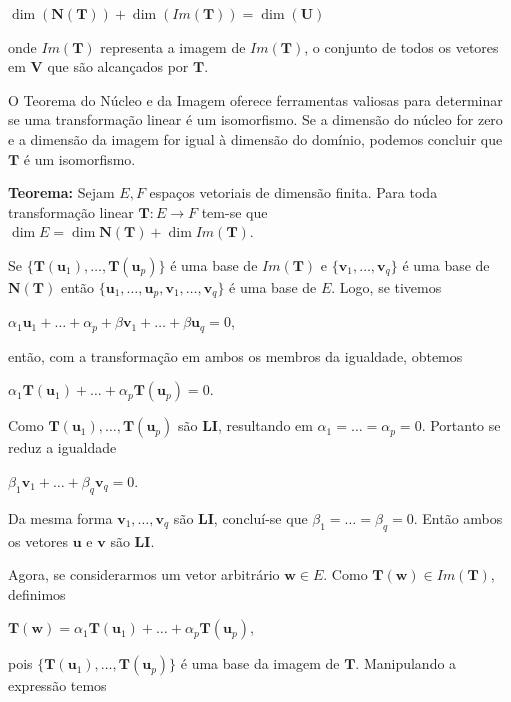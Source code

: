 \centerline{$\dim(\mathbf{N}(\mathbf{T})) + \dim(Im(\mathbf{T})) = \dim(\mathbf{U})$}

\noindent onde $Im(\mathbf{T})$ representa a imagem de $Im(\mathbf{T})$, o conjunto de todos os vetores em $\mathbf{V}$ que são alcançados por $\mathbf{T}$.

O Teorema do Núcleo e da Imagem oferece ferramentas valiosas para determinar se uma transformação linear é um isomorfismo. Se a dimensão do núcleo for zero e a dimensão da imagem for igual à dimensão do domínio, podemos concluir que $\mathbf{T}$ é um isomorfismo.

\noindent\textbf{Teorema:} Sejam $E, F$ espaços vetoriais de dimensão finita. Para toda transformação linear $\mathbf{T}: E \longrightarrow F$ tem-se que $\dim E = \dim \mathbf{N}(\mathbf{T}) + \dim Im(\mathbf{T})$.

Se $\{\mathbf{T}(\mathbf{u}_1), \ldots, \mathbf{T}(\mathbf{u}_p)\}$ é uma base de $Im(\mathbf{T})$ e $\{\mathbf{v}_1, \ldots, \mathbf{v}_q\}$ é uma base de $\mathbf{N}(\mathbf{T})$ então $\{\mathbf{u}_1, \ldots, \mathbf{u}_p, \mathbf{v}_1, \ldots, \mathbf{v}_q\}$ é uma base de $E$. Logo, se tivemos

\centerline{$\alpha_1\mathbf{u}_1 + \ldots + \alpha_p + \beta\mathbf{v}_1 + \ldots + \beta\mathbf{u}_q = 0$,}

então, com a transformação em ambos os membros da igualdade, obtemos

\centerline{$\alpha_1\mathbf{T}(\mathbf{u}_1) + \ldots + \alpha_p\mathbf{T}(\mathbf{u}_p) = 0$.}

Como $\mathbf{T}(\mathbf{u}_1), \ldots, \mathbf{T}(\mathbf{u}_p)$ são \textbf{LI}, resultando em $\alpha_1 = \ldots = \alpha_p = 0$. Portanto se reduz a igualdade

\centerline{$\beta_1\mathbf{v}_1 + \ldots + \beta_q\mathbf{v}_q = 0$.}

Da mesma forma $\mathbf{v}_1, \ldots, \mathbf{v}_q$ são \textbf{LI}, concluí-se que $\beta_1 = \ldots = \beta_q = 0$. Então ambos os vetores $\mathbf{u}$ e $\mathbf{v}$ são \textbf{LI}.

Agora, se considerarmos um vetor arbitrário $\mathbf{w} \in E$. Como $\mathbf{T}(\mathbf{w}) \in Im(\mathbf{T})$, definimos

\centerline{$\mathbf{T}(\mathbf{w}) = \alpha_1\mathbf{T}(\mathbf{u}_1) + \ldots + \alpha_p\mathbf{T}(\mathbf{u}_p)$,}

pois $\{\mathbf{T}(\mathbf{u}_1), \ldots, \mathbf{T}(\mathbf{u}_p)\}$ é uma base da imagem de $\mathbf{T}$. Manipulando a expressão temos

